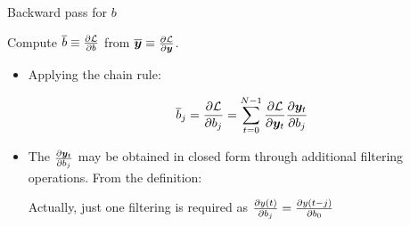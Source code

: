 \documentclass{beamer}
\begin{document}
 \begin{frame}{Backward pass for $b$}
 
 Compute $\overline{b} \equiv \frac{\partial \mathcal{L}}{\partial b}$ from $\overline{\bm{y}}\equiv \frac{\partial \mathcal{L}}{\partial \bm{y}}$. \\
 \pause
 \begin{itemize}
 \item Applying the chain rule:
 \begin{footnotesize}
$$\overline{b}_j = \frac{\partial \mathcal{L}}{\partial b_j} 
= \sum_{t=0}^{N-1}{\frac{\partial \mathcal{L}}{\partial \bm{y}_t} \frac{\partial \bm{y}_t}{\partial b_j}}
$$
\end{footnotesize}
\pause
\item The   $\frac{\partial \bm{y}_t}{\partial b_j}$ may be obtained in closed form through additional filtering 
operations. From the definition:
\pause
Actually, just one filtering is required as $\frac{\partial y(t)}{\partial b_j} = \frac{\partial y(t-j)}{\partial b_0}$
\end{itemize}
\end{frame}
\end{document}
